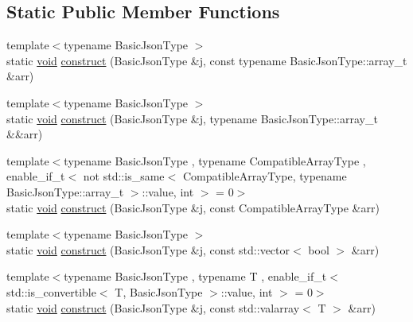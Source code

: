 \subsection*{Static Public Member Functions}
\begin{DoxyCompactItemize}
\item 
{\footnotesize template$<$typename Basic\+Json\+Type $>$ }\\static \hyperlink{namespacenlohmann_1_1detail_a59fca69799f6b9e366710cb9043aa77d}{void} \hyperlink{structnlohmann_1_1detail_1_1external__constructor_3_01value__t_1_1array_01_4_abfb2a6eec0bc21e8a7438546aebc55d8}{construct} (Basic\+Json\+Type \&j, const typename Basic\+Json\+Type\+::array\+\_\+t \&arr)
\item 
{\footnotesize template$<$typename Basic\+Json\+Type $>$ }\\static \hyperlink{namespacenlohmann_1_1detail_a59fca69799f6b9e366710cb9043aa77d}{void} \hyperlink{structnlohmann_1_1detail_1_1external__constructor_3_01value__t_1_1array_01_4_a50474d6624957a630a1d398cac1e7bfa}{construct} (Basic\+Json\+Type \&j, typename Basic\+Json\+Type\+::array\+\_\+t \&\&arr)
\item 
{\footnotesize template$<$typename Basic\+Json\+Type , typename Compatible\+Array\+Type , enable\+\_\+if\+\_\+t$<$ not std\+::is\+\_\+same$<$ Compatible\+Array\+Type, typename Basic\+Json\+Type\+::array\+\_\+t $>$\+::value, int $>$  = 0$>$ }\\static \hyperlink{namespacenlohmann_1_1detail_a59fca69799f6b9e366710cb9043aa77d}{void} \hyperlink{structnlohmann_1_1detail_1_1external__constructor_3_01value__t_1_1array_01_4_a110f50fd5378da876d9a6d6a8d945e37}{construct} (Basic\+Json\+Type \&j, const Compatible\+Array\+Type \&arr)
\item 
{\footnotesize template$<$typename Basic\+Json\+Type $>$ }\\static \hyperlink{namespacenlohmann_1_1detail_a59fca69799f6b9e366710cb9043aa77d}{void} \hyperlink{structnlohmann_1_1detail_1_1external__constructor_3_01value__t_1_1array_01_4_a4ebb19b1cb84b4cb224a4c5322e16f14}{construct} (Basic\+Json\+Type \&j, const std\+::vector$<$ bool $>$ \&arr)
\item 
{\footnotesize template$<$typename Basic\+Json\+Type , typename T , enable\+\_\+if\+\_\+t$<$ std\+::is\+\_\+convertible$<$ T, Basic\+Json\+Type $>$\+::value, int $>$  = 0$>$ }\\static \hyperlink{namespacenlohmann_1_1detail_a59fca69799f6b9e366710cb9043aa77d}{void} \hyperlink{structnlohmann_1_1detail_1_1external__constructor_3_01value__t_1_1array_01_4_a1b9226304e6492141080b4ebf228ddac}{construct} (Basic\+Json\+Type \&j, const std\+::valarray$<$ T $>$ \&arr)
\end{DoxyCompactItemize}


